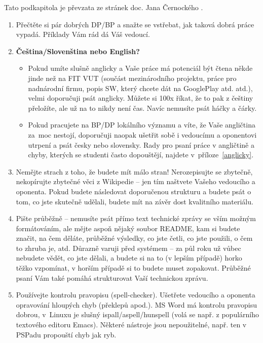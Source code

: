 Tato podkapitola je převzata ze stránek doc. Jana Černockého \cite{Cernocky}.

\begin{enumerate}
  \item{Přečtěte si pár dobrých DP/BP a snažte se vstřebat, jak taková dobrá práce vypadá. Příklady Vám rád dá Váš vedoucí.}
  \item{\textbf{Čeština/Slovenština nebo English?}
    \begin{itemize}
      \item Pokud umíte slušně anglicky a Vaše práce má potenciál být čtena někde jinde než na FIT VUT (součást mezinárodního projektu, práce pro nadnárodní firmu, popis SW, který chcete dát na GooglePlay atd. atd.), velmi doporučuji psát anglicky. Můžete si 100x říkat, že to pak z češtiny přeložíte, ale už na to nikdy není čas. Navíc nemusíte psát háčky a čárky.
      \item  Pokud pracujete na BP/DP lokálního významu a víte, že Vaše angličtina za~moc nestojí, doporučuji naopak ušetřit sobě i vedoucímu a oponentovi utrpení a psát česky nebo slovensky. Rady pro psaní práce v angličtině a chyby, kterých se studenti často dopouštějí, najdete v~příloze~\ref{anglicky}.
    \end{itemize}}
  \item{Nemějte strach z toho, že budete mít málo stran! Nerozepisujte se zbytečně, nekopírujte zbytečné věci z Wikipedie -- jen tím naštvete Vašeho vedoucího a oponenta. Pokud budete následovat doporučenou strukturu a budete psát o tom, co jste skutečně udělali, budete mít na závěr dost kvalitního materiálu. }
  \item{Pište průběžně -- nemusíte psát přímo text technické zprávy se vším možným formátováním, ale mějte aspoň nějaký soubor README, kam si budete značit, na čem děláte, průběžné výsledky, co jste četli, co jste použili, o čem to zhruba je, atd. Důrazně varuji před systémem  -- za půl roku už vůbec nebudete vědět, co jste dělali, a budete si na to (v lepším případě) horko těžko vzpomínat, v horším případě si to budete muset zopakovat. Průběžné psaní Vám také pomáhá strukturovat Vaší technickou zprávu.}
  \item{Používejte kontrolu pravopisu (spell-checker). Ušetřete vedoucího a oponenta opravování hloupých chyb (překlepů apod.). MS Word má kontrolu pravopisu dobrou, v~Linuxu je slušný ispall/aspell/hunspell (volá se např. z populárního textového editoru Emacs). Některé nástroje jsou nepoužitelné, např. ten v PSPadu propouští chyb jak ryb.}

\end{enumerate}

